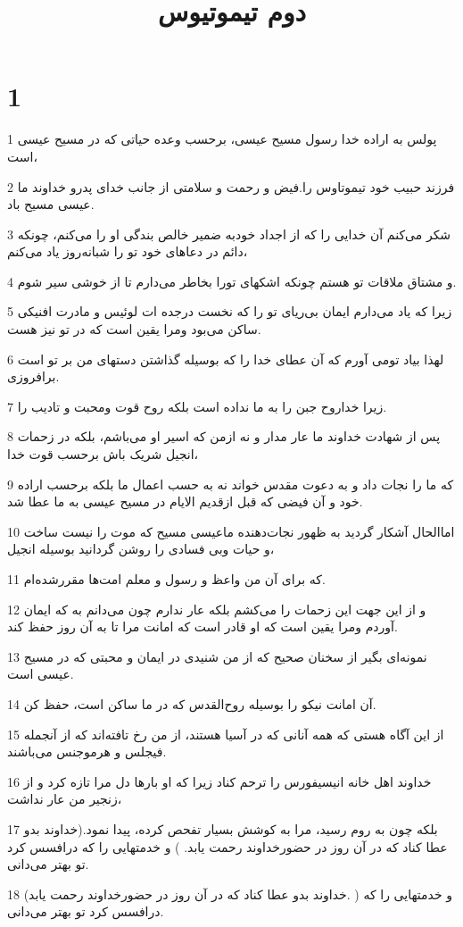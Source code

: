

\title{دوم تيموتيوس}


\chapter{1}

\par 1 پولس به اراده خدا رسول مسیح عیسی، برحسب وعده حیاتی که در مسیح عیسی است،
\par 2 فرزند حبیب خود تیموتاوس را.فیض و رحمت و سلامتی از جانب خدای پدرو خداوند ما عیسی مسیح باد.
\par 3 شکر می‌کنم آن خدایی را که از اجداد خودبه ضمیر خالص بندگی او را می‌کنم، چونکه دائم در دعاهای خود تو را شبانه‌روز یاد می‌کنم،
\par 4 و مشتاق ملاقات تو هستم چونکه اشکهای تورا بخاطر می‌دارم تا از خوشی سیر شوم.
\par 5 زیرا که یاد می‌دارم ایمان بی‌ریای تو را که نخست درجده ات لوئیس و مادرت افنیکی ساکن می‌بود ومرا یقین است که در تو نیز هست.
\par 6 لهذا بیاد تومی آورم که آن عطای خدا را که بوسیله گذاشتن دستهای من بر تو است برافروزی.
\par 7 زیرا خداروح جبن را به ما نداده است بلکه روح قوت ومحبت و تادیب را.
\par 8 پس از شهادت خداوند ما عار مدار و نه ازمن که اسیر او می‌باشم، بلکه در زحمات انجیل شریک باش برحسب قوت خدا،
\par 9 که ما را نجات داد و به دعوت مقدس خواند نه به حسب اعمال ما بلکه برحسب اراده خود و آن فیضی که قبل ازقدیم الایام در مسیح عیسی به ما عطا شد.
\par 10 اماالحال آشکار گردید به ظهور نجات‌دهنده ماعیسی مسیح که موت را نیست ساخت و حیات وبی فسادی را روشن گردانید بوسیله انجیل،
\par 11 که برای آن من واعظ و رسول و معلم امت‌ها مقررشده‌ام.
\par 12 و از این جهت این زحمات را می‌کشم بلکه عار ندارم چون می‌دانم به که ایمان آوردم ومرا یقین است که او قادر است که امانت مرا تا به آن روز حفظ کند.
\par 13 نمونه‌ای بگیر از سخنان صحیح که از من شنیدی در ایمان و محبتی که در مسیح عیسی است.
\par 14 آن امانت نیکو را بوسیله روح‌القدس که در ما ساکن است، حفظ کن.
\par 15 از این آگاه هستی که همه آنانی که در آسیا هستند، از من رخ تافته‌اند که از آنجمله فیجلس و هرموجنس می‌باشند.
\par 16 خداوند اهل خانه انیسیفورس را ترحم کناد زیرا که او بارها دل مرا تازه کرد و از زنجیر من عار نداشت،
\par 17 بلکه چون به روم رسید، مرا به کوشش بسیار تفحص کرده، پیدا نمود.(خداوند بدو عطا کناد که در آن روز در حضورخداوند رحمت یابد. ) و خدمتهایی را که درافسس کرد تو بهتر می‌دانی.
\par 18 (خداوند بدو عطا کناد که در آن روز در حضورخداوند رحمت یابد. ) و خدمتهایی را که درافسس کرد تو بهتر می‌دانی.

